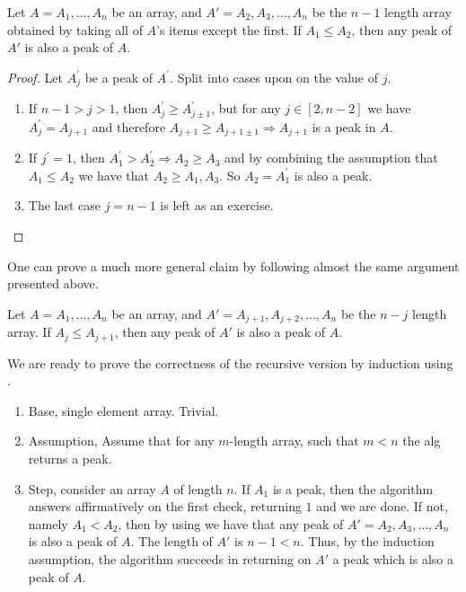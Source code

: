  \begin{claim} \label{claim:subarray} 
Let $A = A_1, \dots, A_n$ be an array, and $A' = A_2, A_3, \dots, A_n$ be the $n-1$ length array obtained by taking all of $A$'s items except the first. If $A_1 \le A_2$, then any peak of $A'$ is also a peak of $A$.
\end{claim}
\begin{proof} 
Let $A^{\prime}_{j}$ be a peak of $A^{\prime}$. Split into cases upon on the value of $j$.

\begin{enumerate}
  \item If $n-1 > j > 1$, then $A^{\prime}_{j} \ge A^{\prime}_{j \pm 1}$, but for any $j \in [2, n-2]$ we have $A^{\prime}_{j} = A_{j+1}$ and therefore $A_{j+1} \ge A_{j+1 \pm 1} \Rightarrow A_{j+1}$ is a peak in $A$.
  \item If $j^{\prime} = 1$, then $A^{\prime}_{1} > A^{\prime}_{2} \Rightarrow A_{2} \ge A_{3}$ and by combining the assumption that $A_{1} \le A_{2}$ we have that $A_{2} \ge A_{1}, A_{3}$. So $A_{2} = A^{\prime}_{1}$ is also a peak.
  \item The last case $j = n-1$ is left as an exercise.
\end{enumerate}
\end{proof}

One can prove a much more general claim by following almost the same argument presented above.

 \begin{claim} \label{claim:subarraymiddle} 
   Let $A = A_1, \dots, A_n$ be an array, and $A' = A_{j+1}, A_{j+2}, \dots, A_n$ be the $n-j$ length array. If $A_j \le A_{j+1}$, then any peak of $A'$ is also a peak of $A$.
\end{claim}

We are ready to prove the correctness of the recursive version by induction using . 

\begin{enumerate}
  \item Base, single element array. Trivial. 
  \item Assumption, Assume that for any $m$-length array, such that $m<n$ the alg returns a peak. 
  \item Step, consider an array $A$ of length $n$. If $A_1$ is a peak, then the algorithm answers affirmatively on the first check, returning $1$ and we are done. If not, namely $A_1 < A_2$, then by using  we have that any peak of $A' = A_2, A_3, \dots, A_n$ is also a peak of $A$. The length of $A'$ is $n-1 < n$. Thus, by the induction assumption, the algorithm succeeds in returning on $A'$ a peak which is also a peak of $A$.
\end{enumerate}

